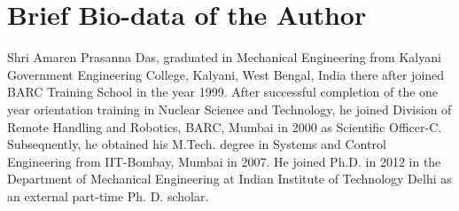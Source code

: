 \chapter*{\textbf{Brief Bio-data of the Author}}
Shri Amaren Prasanna Das, graduated in Mechanical Engineering from Kalyani Government Engineering College, Kalyani, West Bengal, India there after joined BARC Training School in the year 1999. After successful completion of the one year orientation training in Nuclear Science and Technology, he joined Division of Remote Handling and Robotics, BARC, Mumbai in 2000 as Scientific Officer-C. Subsequently, he obtained his M.Tech. degree in Systems and Control Engineering from IIT-Bombay, Mumbai in 2007. He joined Ph.D. in 2012 in the Department of Mechanical Engineering at Indian Institute of Technology Delhi as an external part-time Ph. D. scholar.
